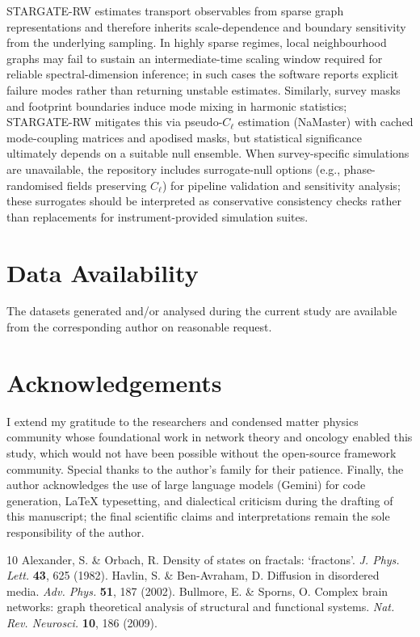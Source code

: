 \documentclass[11pt,a4paper]{article}
\begin{document}
STARGATE-RW estimates transport observables from sparse graph representations and therefore inherits scale-dependence and boundary sensitivity from the underlying sampling. In highly sparse regimes, local neighbourhood graphs may fail to sustain an intermediate-time scaling window required for reliable spectral-dimension inference; in such cases the software reports explicit failure modes rather than returning unstable estimates. Similarly, survey masks and footprint boundaries induce mode mixing in harmonic statistics; STARGATE-RW mitigates this via pseudo-$C_\ell$ estimation (NaMaster) with cached mode-coupling matrices and apodised masks, but statistical significance ultimately depends on a suitable null ensemble. When survey-specific simulations are unavailable, the repository includes surrogate-null options (e.g., phase-randomised fields preserving $C_\ell$) for pipeline validation and sensitivity analysis; these surrogates should be interpreted as conservative consistency checks rather than replacements for instrument-provided simulation suites.

\section*{Data Availability}
The datasets generated and/or analysed during the current study are available from the corresponding author on reasonable request.

\section*{Acknowledgements}
I extend my gratitude to the researchers and condensed matter physics community whose foundational work in network theory and oncology enabled this study, which would not have been possible without the open-source framework community. Special thanks to the author's family for their patience. Finally, the author acknowledges the use of large language models (Gemini) for code generation, LaTeX typesetting, and dialectical criticism during the drafting of this manuscript; the final scientific claims and interpretations remain the sole responsibility of the author.

\begin{thebibliography}{10}
 Alexander, S. \& Orbach, R. Density of states on fractals: `fractons'. \textit{J. Phys. Lett.} \textbf{43}, 625 (1982).
 Havlin, S. \& Ben-Avraham, D. Diffusion in disordered media. \textit{Adv. Phys.} \textbf{51}, 187 (2002).
 Bullmore, E. \& Sporns, O. Complex brain networks: graph theoretical analysis of structural and functional systems. \textit{Nat. Rev. Neurosci.} \textbf{10}, 186 (2009).
\end{thebibliography}
\end{document}
